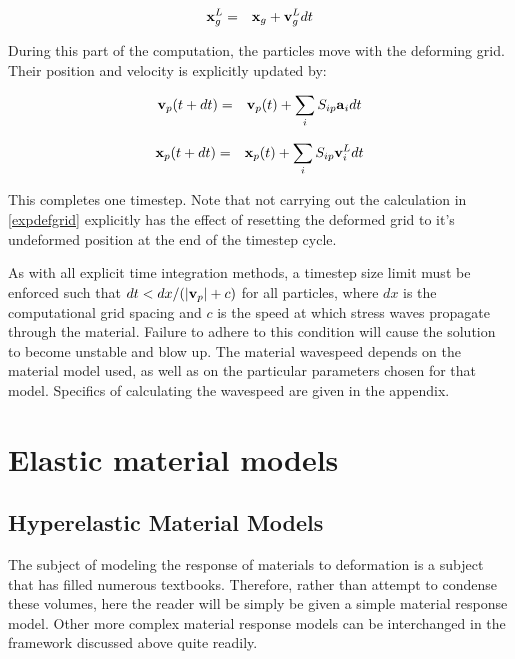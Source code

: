 \begin{eqnarray}
	\mbox{\ensuremath{\mathbf{x}}}^L_g &=& \mbox{\ensuremath{\mathbf{x}}}_g  + \mbox{\ensuremath{\mathbf{v}}}^L_g dt     
\label{expdefgrid}
\end{eqnarray}

During this part of the computation, the particles move with the 
deforming
grid.  Their position and velocity is explicitly updated by:

\begin{eqnarray}
	\mbox{\ensuremath{\mathbf{v}}}_p (t + dt)  &=& \mbox{\ensuremath{\mathbf{v}}}_p (t)  + \sum_{i} S_{ip} 
\mbox{\ensuremath{\mathbf{a}}}_i  dt
\end{eqnarray}

\begin{eqnarray}
	\mbox{\ensuremath{\mathbf{x}}}_p (t + dt)  &=& \mbox{\ensuremath{\mathbf{x}}}_p (t)  + \sum_{i} S_{ip} 
\mbox{\ensuremath{\mathbf{v}}}^L_i  dt
\end{eqnarray}

This completes one timestep.  Note that not carrying out the 
calculation
in \ref{expdefgrid} explicitly has the effect of resetting the 
deformed
grid to it's undeformed position at the end of the timestep 
cycle.

As with all explicit time integration methods, a timestep size 
limit must
be enforced such that $dt < dx/(|\mbox{\ensuremath{\mathbf{v}}}_p| + c)$ for all 
particles, where $dx$ is the computational grid spacing and $c$ 
is the speed at which stress waves propagate through the 
material.
Failure to adhere to this condition will cause the solution to 
become
unstable and blow up.  The material wavespeed depends on the 
material model used, as well as on the particular parameters
chosen for that model.  Specifics of calculating the wavespeed
are given in the appendix.

%
%

\chapter{Elastic material models}
\section{Hyperelastic Material Models}

The subject of modeling the response of materials to deformation 
is a subject that has filled numerous textbooks.  Therefore, 
rather than attempt to condense these volumes, here the reader 
will be simply be given a simple material response model.  Other 
more complex material response models can be interchanged in the 
framework discussed above quite readily.

